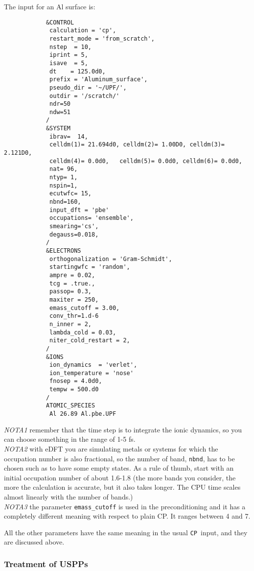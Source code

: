 \documentclass[12pt,a4paper]{article}
\def\CP{\texttt{CP}}
\begin{document}
The input for an Al surface is:
\begin{verbatim}
            &CONTROL
             calculation = 'cp',
             restart_mode = 'from_scratch',
             nstep  = 10,
             iprint = 5,
             isave  = 5,
             dt    = 125.0d0,
             prefix = 'Aluminum_surface',
             pseudo_dir = '~/UPF/',
             outdir = '/scratch/'
             ndr=50
             ndw=51
            /
            &SYSTEM
             ibrav=  14,
             celldm(1)= 21.694d0, celldm(2)= 1.00D0, celldm(3)= 2.121D0,
             celldm(4)= 0.0d0,   celldm(5)= 0.0d0, celldm(6)= 0.0d0,
             nat= 96,
             ntyp= 1,
             nspin=1,
             ecutwfc= 15,
             nbnd=160,
             input_dft = 'pbe'
             occupations= 'ensemble',
             smearing='cs',
             degauss=0.018,
            /
            &ELECTRONS
             orthogonalization = 'Gram-Schmidt',
             startingwfc = 'random',
             ampre = 0.02,
             tcg = .true.,
             passop= 0.3,
             maxiter = 250,
             emass_cutoff = 3.00,
             conv_thr=1.d-6
             n_inner = 2,
             lambda_cold = 0.03,
             niter_cold_restart = 2,
            /
            &IONS
             ion_dynamics  = 'verlet',
             ion_temperature = 'nose'
             fnosep = 4.0d0,
             tempw = 500.d0
            /
            ATOMIC_SPECIES
             Al 26.89 Al.pbe.UPF
\end{verbatim}
{\em NOTA1}  remember that the time step is to integrate the ionic dynamics,
so you can choose something in the range of 1-5 fs. \\
{\em NOTA2} with eDFT you are simulating metals or systems for which the 
occupation number is also fractional, so the number of band, \texttt{nbnd}, has to 
be chosen such as to have some empty states. As a rule of thumb, start
with an initial occupation number of about 1.6-1.8 (the more bands you 
consider, the more the calculation is accurate, but it also takes longer.
The CPU time scales almost linearly with the number of bands.) \\
{\em NOTA3} the parameter \texttt{emass\_cutoff} is used in the preconditioning 
and it has a completely different meaning with respect to plain CP. 
It ranges between 4 and 7.

All the other parameters have the same meaning in the usual \CP\ input, 
and they are discussed above.

\subsubsection{Treatment of USPPs}
\end{document}
